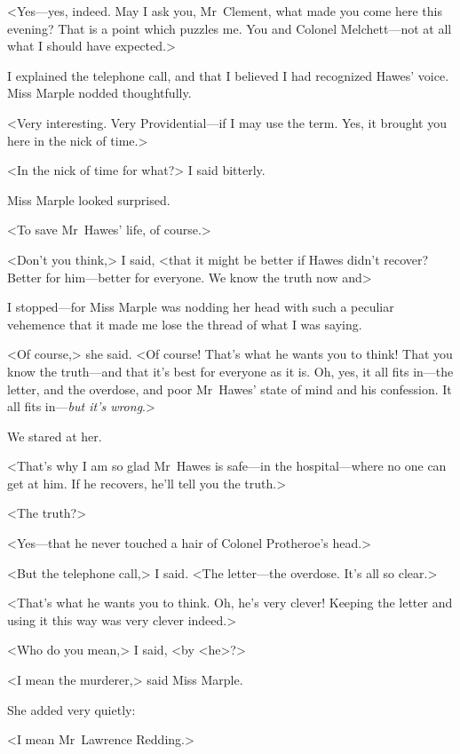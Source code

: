 <Yes—yes, indeed. May I ask you, Mr~Clement, what made you come here this evening? That is a point which puzzles me. You and Colonel Melchett—not at all what I should have expected.>

I explained the telephone call, and that I believed I had recognized Hawes' voice. Miss Marple nodded thoughtfully.

<Very interesting. Very Providential—if I may use the term. Yes, it brought you here in the nick of time.>

<In the nick of time for what?> I said bitterly.

Miss Marple looked surprised.

<To save Mr~Hawes' life, of course.>

<Don't you think,> I said, <that it might be better if Hawes didn't recover? Better for him—better for everyone. We know the truth now and\longdash>

I stopped—for Miss Marple was nodding her head with such a peculiar vehemence that it made me lose the thread of what I was saying.

<Of course,> she said. <Of course! That's what he wants you to think! That you know the truth—and that it's best for everyone as it is. Oh, yes, it all fits in—the letter, and the overdose, and poor Mr~Hawes' state of mind and his confession. It all fits in—\emph{but it's wrong}.>

We stared at her.

<That's why I am so glad Mr~Hawes is safe—in the hospital—where no one can get at him. If he recovers, he'll tell you the truth.>

<The truth?>

<Yes—that he never touched a hair of Colonel Protheroe's head.>

<But the telephone call,> I said. <The letter—the overdose. It's all so clear.>

<That's what he wants you to think. Oh, he's very clever! Keeping the letter and using it this way was very clever indeed.>

<Who do you mean,> I said, <by <he>?>

<I mean the murderer,> said Miss Marple.

\begin{a4}
	\enlargethispage{\baselineskip}
\end{a4}

She added very quietly:

<I mean Mr~Lawrence Redding.>